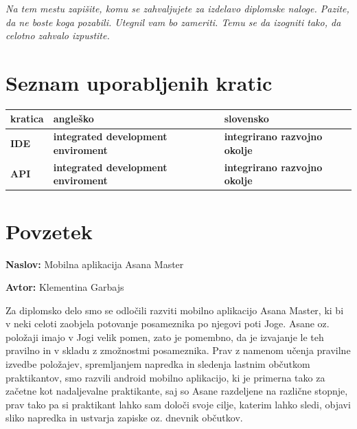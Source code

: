\documentclass[a4paper, 12pt]{book}
\newcommand{\ttitle}{Mobilna aplikacija Asana Master}
\newcommand{\tauthor}{Klementina Garbajs}
\newcommand{\clearemptydoublepage}{\newpage{\pagestyle{empty}\cleardoublepage}}
\begin{document}
\vspace{2cm}

\clearemptydoublepage

\thispagestyle{empty}\mbox{}\vfill\null\it%
\noindent
Na tem mestu zapišite, komu se zahvaljujete za izdelavo diplomske naloge. Pazite, da ne boste koga pozabili. Utegnil vam bo zameriti. Temu se da izogniti tako, da celotno zahvalo izpustite.
\rm\normalfont

\clearemptydoublepage

\pagestyle{empty}
\def\thepage{}%
\tableofcontents{}

\clearemptydoublepage


\chapter*{Seznam uporabljenih kratic}  %

\noindent\begin{tabular}{p{}|p{}|p{}}    %
  {\bf kratica} & {\bf angleško} & {\bf slovensko} \\ \hline
  {\bf IDE} & {\bf integrated development enviroment} & {\bf integrirano razvojno okolje} \\ \hline
  {\bf API} & {\bf integrated development enviroment} & {\bf integrirano razvojno okolje} \\ \hline
\end{tabular}


\clearemptydoublepage

\chapter*{Povzetek}

\noindent\textbf{Naslov:} \ttitle
\bigskip

\noindent\textbf{Avtor:} \tauthor
\bigskip

\noindent 
Za diplomsko delo smo se odločili razviti mobilno aplikacijo Asana Master, ki bi v neki celoti zaobjela potovanje posameznika po njegovi poti Joge. Asane oz. položaji imajo v Jogi velik pomen, zato je pomembno, da je izvajanje le teh pravilno in v skladu z zmožnostmi posameznika. Prav z namenom učenja pravilne izvedbe položajev, spremljanjem napredka in sledenja lastnim občutkom praktikantov, smo razvili android mobilno aplikacijo, ki je primerna tako za začetne kot nadaljevalne praktikante, saj so Asane razdeljene na različne stopnje, prav tako pa si praktikant lahko sam določi svoje cilje, katerim lahko sledi, objavi sliko napredka in ustvarja zapiske oz. dnevnik občutkov.
\end{document}
